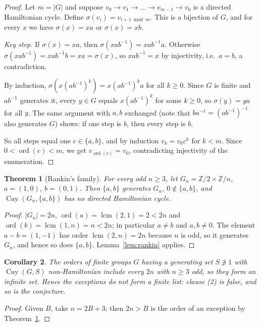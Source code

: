 \documentclass[11pt]{article}
\newtheorem{theorem}{Theorem}
\newtheorem{corollary}[theorem]{Corollary}
\theoremstyle{definition}
\theoremstyle{remark}
\renewcommand{\_}{\oldus\allowbreak}
\newcommand{\Cay}{\operatorname{Cay}}
\newcommand{\ord}{\operatorname{ord}}
\newcommand{\Z}{\mathbb{Z}}
\begin{document}
\begin{proof}
Let $m = |G|$ and suppose $v_0 \to v_1 \to \dots \to v_{m-1} \to v_0$ is a directed Hamiltonian cycle.
Define $\sigma(v_i) = v_{i+1 \bmod m}$. This is a bijection of $G$, and for every $x$ we have
$\sigma(x) = xa$ or $\sigma(x) = xb$.

\emph{Key step.} If $\sigma(x) = xa$, then $\sigma(x ab^{-1}) = xab^{-1}a$. Otherwise
$\sigma(xab^{-1}) = xab^{-1}b = xa = \sigma(x)$, so $xab^{-1} = x$ by injectivity, i.e.\ $a = b$, a
contradiction.

By induction, $\sigma(x(ab^{-1})^k) = x(ab^{-1})^k a$ for all $k \ge 0$. Since $G$ is finite and
$ab^{-1}$ generates it, every $y\in G$ equals $x(ab^{-1})^k$ for some $k\ge 0$, so $\sigma(y) = ya$ for
all $y$. The same argument with $a, b$ exchanged (note that $ba^{-1} = (ab^{-1})^{-1}$ also generates
$G$) shows: if one step is $b$, then every step is $b$.

So all steps equal one $c \in \{a,b\}$, and by induction $v_k = v_0 c^k$ for $k < m$. Since
$0 < \ord(c) < m$, we get $v_{\ord(c)} = v_0$, contradicting injectivity of the enumeration.
\end{proof}

\begin{theorem}[Rankin's family]\label{thm:family}
For every odd $n \ge 3$, let $G_n = \Z/2 \times \Z/n$, $a = (1,0)$, $b = (0,1)$. Then $\{a,b\}$ generates
$G_n$, $0 \notin \{a,b\}$, and $\Cay(G_n,\{a,b\})$ has no directed Hamiltonian cycle.
\end{theorem}

\begin{proof}
$|G_n| = 2n$, $\ord(a) = \operatorname{lcm}(2,1) = 2 < 2n$ and $\ord(b) = \operatorname{lcm}(1,n) = n < 2n$;
in particular $a \neq b$ and $a,b \neq 0$. The element $a - b = (1,-1)$ has order
$\operatorname{lcm}(2,n) = 2n$ because $n$ is odd, so it generates $G_n$, and hence so does $\{a,b\}$.
Lemma~\ref{lem:rankin} applies.
\end{proof}

\begin{corollary}\label{cor:main}
The orders of finite groups $G$ having a generating set $S \not\ni 1$ with $\Cay(G,S)$ non-Hamiltonian
include every $2n$ with $n\ge 3$ odd, so they form an infinite set. Hence the exceptions do not form a
finite list: clause (2) is false, and so is the conjecture.
\end{corollary}

\begin{proof}
Given $B$, take $n = 2B+3$; then $2n > B$ is the order of an exception by Theorem~\ref{thm:family}.
\end{proof}
\end{document}
